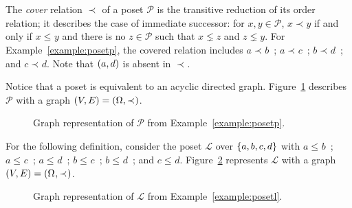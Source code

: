 \documentclass[12pt]{llncs}
\DeclarePairedDelimiter{\set}{\{}{\}}
\DeclarePairedDelimiter{\tuple}{(}{)}
\let\oldleq\leq
\renewcommand{\leq}[1][]{\oldleq_{#1}}
\newcommand{\poset}[1]{\mathcal{#1}}
\newcommand{\uni}[1][]{\Omega_{#1}}
\newcommand{\covered}[1][]{\prec_{#1}}
\begin{document}
The \emph{cover} relation $\covered$ of a poset $\poset{P}$ is the transitive reduction of its order relation; it describes the case of immediate successor: for $x, y \!\in\! \poset{P}$, $x \covered y$ if and only if $x \leq y$ and there is no $z \!\in\! \poset{P}$ such that $x \lneq z$ and $z \lneq y$. For Example~\ref{example:posetp}, the covered relation includes $a \covered b$\ ; $a \covered c$\ ; $b \covered d$\ ; and $c \covered d$. Note that $\tuple{a,d}$ is absent in $\covered$.

Notice that a poset is equivalent to an acyclic directed graph. Figure~\ref{figure:posetp} describes $\poset{P}$ with a graph $\tuple{V,E} = \tuple{\Omega,\covered}$.

\begin{figure}[h]
    \centering
    \caption{Graph representation of $\poset{P}$ from Example~\ref{example:posetp}.}
    \label{figure:posetp}
\end{figure}

\begin{example}
    For the following definition, consider the poset $\poset{L}$ over $\set{a,b,c,d}$ with $a \leq b$\ ; $a \leq c$\ ; $a \leq d$\ ; $b \leq c$\ ; $b \leq d$\ ; and $c \leq d$. Figure~\ref{figure:posetl} represents $\poset{L}$ with a graph $\tuple{V,E} = \tuple{\uni,\covered}$.
    \label{example:posetl}
\end{example}

\begin{figure}[h]
    \centering
    \caption{Graph representation of $\poset{L}$ from Example~\ref{example:posetl}.}
    \label{figure:posetl}
\end{figure}
\end{document}
